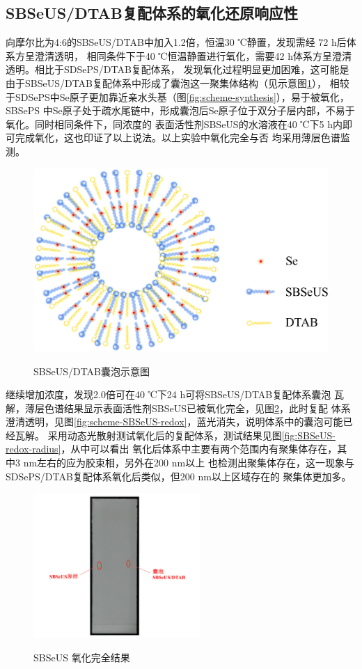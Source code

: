 \documentclass[bachelor,winfonts,replaceperiod]{jnuthesis}
\begin{document}
    \subsection{SBSeUS/DTAB复配体系的氧化还原响应性}
    向摩尔比为4:6的SBSeUS/DTAB中加入1.2倍，恒温30 ℃静置，发现需经 72 h后体系方呈澄清透明，
    相同条件下于40 ℃恒温静置进行氧化，需要42 h体系方呈澄清透明。相比于SDSePS/DTAB复配体系，
    发现氧化过程明显更加困难，这可能是由于SBSeUS/DTAB复配体系中形成了囊泡这一聚集体结构（见示意图\ref{fig:scheme-vesicle}），
    相较于SDSePS中Se原子更加靠近亲水头基（图\ref{fig:scheme-synthesis}），易于被氧化，SBSePS
    中Se原子处于疏水尾链中，形成囊泡后Se原子位于双分子层内部，不易于氧化。同时相同条件下，同浓度的
    表面活性剂SBSeUS的水溶液在40 ℃下5 h内即可完成氧化，这也印证了以上说法。以上实验中氧化完全与否
    均采用薄层色谱监测。
    \begin{figure}[htbp]
        \centering
        \includegraphics[width=0.4\linewidth]{figure/vesicle-scheme.pdf}\\
        \caption{SBSeUS/DTAB囊泡示意图}\label{fig:scheme-vesicle}
    \end{figure}
    
    继续增加浓度，发现2.0倍可在40 ℃下24 h可将SBSeUS/DTAB复配体系囊泡
    瓦解，薄层色谱结果显示表面活性剂SBSeUS已被氧化完全，见图\ref{fig:SBSeUS-Ox-tlc}，此时复配
    体系澄清透明，见图\ref{fig:scheme-SBSeUS-redox}，蓝光消失，说明体系中的囊泡可能已经瓦解。
    采用动态光散射测试氧化后的复配体系，测试结果见图\ref{fig:SBSeUS-redox-radius}，从中可以看出
    氧化后体系中主要有两个范围内有聚集体存在，其中3 nm左右的应为胶束相，另外在200 nm以上
    也检测出聚集体存在，这一现象与SDSePS/DTAB复配体系氧化后类似，但200 nm以上区域存在的
    聚集体更加多。
    \begin{figure}[htbp]
        \centering
        \includegraphics[height=5.5cm]{figure/SBSeUS-Ox-tlc}\\
        \caption{SBSeUS 氧化完全结果}\label{fig:SBSeUS-Ox-tlc}
    \end{figure}
    
\end{document}
